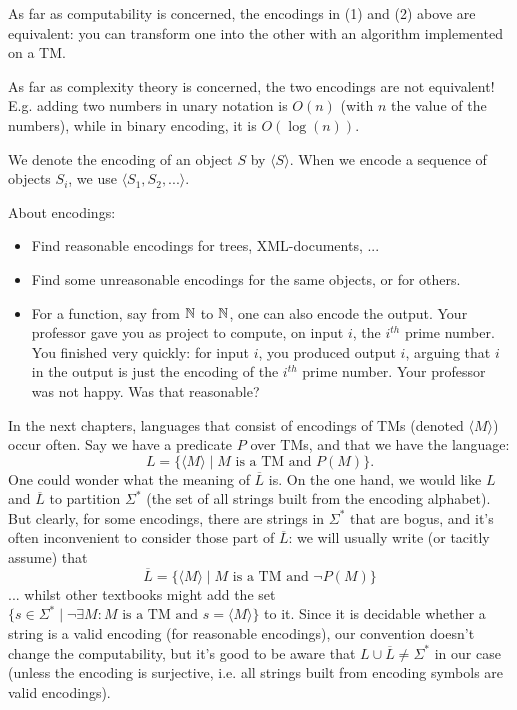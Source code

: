 As far as computability is concerned, the encodings in (1) and (2)
above are equivalent: you can transform one into the other with an
algorithm implemented on a TM.

As far as complexity theory is concerned, the two encodings are not
equivalent! E.g. adding two numbers in unary notation is $O(n)$ (with $n$
the value of the numbers), while in binary encoding, it is
$O(\log(n))$.

We denote the encoding of an object $S$ by $\langle S \rangle$. When
we encode a sequence of objects $S_i$, we use $\langle
S_1,S_2,... \rangle$.

\begin{exercise}
About encodings:
\begin{itemize}
\item Find reasonable encodings for trees, XML-documents, ...

\item Find some unreasonable encodings for the same objects, or for others.

\item For a function, say from $\mathbb{N}$ to $\mathbb{N}$, one can also encode the
output. Your professor gave you as project to compute, on input $i$, the
$i^{th}$ prime number. You finished very quickly: for input $i$, you
produced output $i$, arguing that $i$ in the output is just the
encoding of the $i^{th}$ prime number. Your professor was not
happy. Was that reasonable?

\end{itemize}
\end{exercise}

In the next chapters, languages that consist of encodings of TMs (denoted $\langle M\rangle$) occur often. Say we have a predicate $P$ over TMs, and that we have the language:
\begin{equation*}
	L = \{\langle M\rangle \mid \text{$M$ is a TM and } P(M)\}.
\end{equation*}
One could wonder what the meaning of $\overline L$ is. On the one hand, we would like $L$ and $\overline L$ to partition $\Sigma^*$ (the set of all strings built from the encoding alphabet). But clearly, for some encodings, there are strings in $\Sigma^*$ that are bogus, and it's often inconvenient to consider those part of $\overline L$: we will usually write (or tacitly assume) that
\begin{equation*}
	\overline L = \{\langle M\rangle \mid \text{$M$ is a TM and } \neg P(M)\}
\end{equation*}
... whilst other textbooks might add the set $\{s\in\Sigma^* \mid \text{$\neg\exists M: M$ is a TM and $s = \langle M\rangle$} \}$ to it. Since it is decidable whether a string is a valid encoding (for reasonable encodings), our convention doesn't change the computability, but it's good to be aware that $L \cup \overline L \neq \Sigma^*$ in our case (unless the encoding is surjective, i.e. all strings built from encoding symbols are valid encodings).

